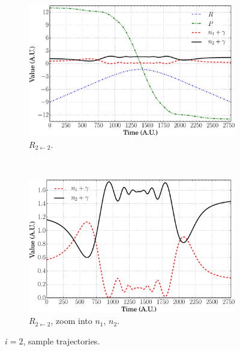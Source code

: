 \documentclass[xetex,mathserif,serif]{beamer}
\newcommand{\rtt}{$ R_{2\leftarrow2} $}
\begin{document}
\begin{frame}
{\begin{figure}
\begin{subfigure}[t]{0.45\textwidth}
\includegraphics[width=\textwidth]{ec_traj_r22.eps}
\vspace{-0.1cm}
\caption{{\fontsize{7}{8}\selectfont \rtt.}}
\end{subfigure}
~
\begin{subfigure}[t]{0.45\textwidth}
\centering
\includegraphics[width=\textwidth]{ec_traj_r22_e.eps}
\vspace{-0.1cm}
\caption{{\fontsize{7}{8}\selectfont \rtt, zoom into $ n_{1}$, $n_{2} $.}}
\end{subfigure}
\vspace{-0.1cm}
\caption{$ i = 2 $, sample trajectories.}
\end{figure}
}{}


\end{frame}
\end{document}
